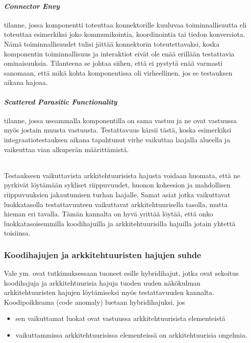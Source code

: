 \documentclass[finnish]{tktltiki2}
\numberwithin{table}{section}
\theoremstyle{definition}
\theoremstyle{remark}
\begin{document}
\paragraph{\textit{Connector Envy}} tilanne, jossa komponentti toteuttaa konnektorille kuuluvaa toiminnallisuutta eli toteuttaa esimerkiksi joko kommunikointia, koordinointia tai tiedon konversiota. Nämä toiminnallisuudet tulisi jättää konnektorin toteutettavaksi, koska komponentin toiminnallisuus ja interaktiot eivät ole enää erillään testattavia ominaisuuksia. Tilanteena se johtaa siihen, että ei pystytä enää varmasti sanomaan, että mikä kohta komponentissa oli virheellinen, jos se testauksen aikana hajoaa.

\paragraph{\textit{Scattered Parasitic Functionality}} tilanne, jossa useammalla komponentilla on sama vastuu ja ne ovat vastuussa myös jostain muusta vastuusta. Testattavuus kärsii tästä, koska esimerkiksi integraatiotestauksen aikana tapahtunut virhe vaikuttaa laajalla alueella ja vaikeuttaa vian alkuperän määrittämistä. 

\noindent
\\Testaukseen vaikuttavista arkkitehtuurisista hajusta voidaan huomata, että ne pyrkivät löytämään sykliset riippuvuudet, huonon koheesion ja mahdollisen riippuvuuksien jakautumisen turhan laajalle. Samat asiat jotka vaikuttavat luokkatasolla testattavuuteen vaikuttavat arkkitehtuurisella tasolla, mutta hieman eri tavalla. Tämän kannalta on hyvä yrittää löytää, että onko luokkatasoisemmilla koodihajuilla ja arkkitehtuurisilla hajuilla jotain yhtettä toisiinsa. 


\subsubsection{Koodihajujen ja arkkitehtuuristen hajujen suhde}

Vale ym. ovat tutkimuksessaan tuoneet esille hybridihajut, jotka ovat sekoitus koodihajuja ja arkkitehtuurisia hajuja tuoden uuden näkökulman arkkitehtuuristen hajujen löytämiseksi myös testattavuuden kannalta. Koodipoikkeama (code anomaly) luetaan hybridihajuksi, jos \citep{vale_bad_2014}

\begin{itemize}
	\item sen vaikuttamat luokat ovat vastuussa arkkitehtuurisista elementeistä
	\item vaikuttammissa arkkitehtuurisissa elementeissä on arkkitehtuurisia ongelmia.
\end{itemize}
\end{document}
